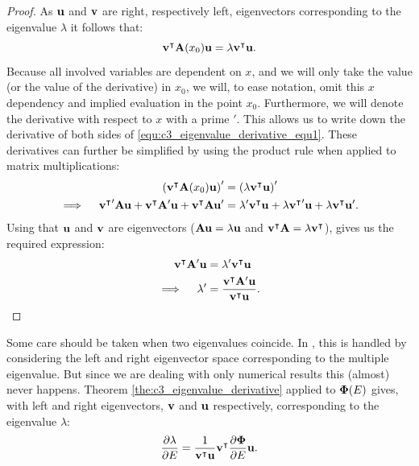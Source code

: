 \begin{proof}
    As $\vb{u}$ and $\vb{v}$ are right, respectively left, eigenvectors corresponding to the eigenvalue $\lambda$ it follows that:
    \begin{equation}\label{equ:c3_eigenvalue_derivative_equ1}
        {\vb{v}}^\intercal\vb{A}(x_0)\vb{u}  = \lambda {\vb{v}}^\intercal\vb{u}\text{.}
    \end{equation}
    Because all involved variables are dependent on $x$, and we will only take the value (or the value of the derivative) in $x_0$, we will, to ease notation, omit this $x$ dependency and implied evaluation in the point $x_0$. Furthermore, we will denote the derivative with respect to $x$ with a prime $'$. This allows us to write down the derivative of both sides of \eqref{equ:c3_eigenvalue_derivative_equ1}. These derivatives can further be simplified by using the product rule when applied to matrix multiplications:
    \begin{align*}
        \left({\vb{v}}^\intercal\vb{A}(x_0)\vb{u}\right)'                                                                    & = \left(\lambda {\vb{v}}^\intercal\vb{u}\right)'                                                                      \\
        \implies \quad {{\vb{v}}^\intercal}'\vb{A}\vb{u} + {\vb{v}}^\intercal\vb{A}'\vb{u} + {\vb{v}}^\intercal\vb{A}\vb{u}' & = \lambda' {\vb{v}}^\intercal\vb{u} + \lambda {{\vb{v}}^\intercal}'\vb{u} + \lambda {\vb{v}}^\intercal\vb{u}'\text{.}
    \end{align*}
    Using that $\vb{u}$ and $\vb{v}$ are eigenvectors ($\vb{A} \vb{u} = \lambda \vb{u}$ and ${\vb{v}}^\intercal\vb{A} = \lambda {\vb{v}}^\intercal$), gives us the required expression:
    \begin{align*}
        {\vb{v}}^\intercal\vb{A}'\vb{u} & = \lambda' {\vb{v}}^\intercal\vb{u}                                         \\
        \implies \quad \lambda'         & = \frac{{\vb{v}}^\intercal\vb{A}'\vb{u}}{{\vb{v}}^\intercal\vb{u}} \text{.}
    \end{align*}
\end{proof}

Some care should be taken when two eigenvalues coincide. In \cite{lancaster_eigenvalues_1964}, this is handled by considering the left and right eigenvector space corresponding to the multiple eigenvalue. But since we are dealing with only numerical results this (almost) never happens. Theorem \ref{the:c3_eigenvalue_derivative} applied to $\vb{\Phi}(E)$ gives, with left and right eigenvectors, $\vb{v}$ and $\vb{u}$ respectively, corresponding to the eigenvalue $\lambda$:
$$
    \pdv{\lambda}{E} = \frac{1}{{\vb{v}}^\intercal\vb{u}}{\vb{v}}^\intercal \pdv{\vb{\Phi}}{E} \vb{u} \text{.}
$$

